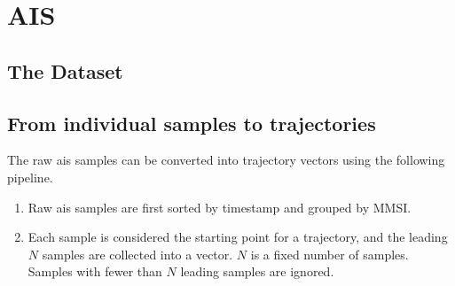 \chapter{AIS}

\section{The Dataset}


\section{From individual samples to trajectories}\label{sec:from_ais_to_traj}
The raw \acrshort{ais} samples can be converted into trajectory vectors using the following pipeline.
\begin{enumerate}
    \item Raw \acrshort{ais} samples are first sorted by timestamp and grouped by MMSI.
    \item Each sample is considered the starting point for a trajectory, and the leading $N$ samples are collected into a vector. $N$ is a fixed number of samples. Samples with fewer than $N$ leading samples are ignored.
\end{enumerate}